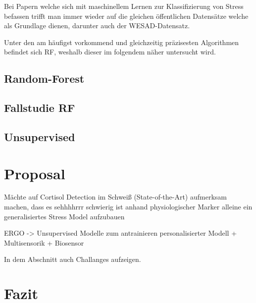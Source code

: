 Bei Papern welche sich mit maschinellem Lernen zur Klassifizierung von Stress befassen trifft man immer wieder auf die gleichen öffentlichen Datensätze welche als Grundlage dienen, darunter auch der WESAD-Datensatz.

Unter den am häufigst vorkommend und gleichzeitig präzisesten Algorithmen befindet sich \ac{RF}, weshalb dieser im folgendem näher untersucht wird. \cite{VOS2023105026}

\subsection{Random-Forest}

\subsection{Fallstudie RF}

\subsection{Unsupervised}


\section{Proposal}
    Mächte auf Cortisol Detection im Schweiß (State-of-the-Art) aufmerksam machen, dass es sehhhhrrr schwierig ist anhand physiologischer Marker alleine ein generalisiertes Stress Model aufzubauen

     ERGO -> Unsupervised Modelle zum antrainieren personalisierter Modell + Multisensorik + Biosensor

    In dem Abschnitt auch Challanges aufzeigen.

\section{Fazit}
    
    
